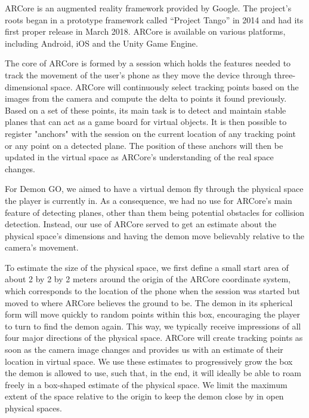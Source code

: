 ARCore is an augmented reality framework provided by Google.
The project's roots began in a prototype framework called \enquote{Project Tango} in 2014 and had its first proper release in March 2018. \cite{ArsARCore}
ARCore is available on various platforms, including Android, iOS and the Unity Game Engine. \cite{ARCore}

The core of ARCore is formed by a session which holds the features needed to track the movement of the user's phone as they move the device through three-dimensional space.
ARCore will continuously select tracking points based on the images from the camera and compute the delta to points it found previously.
Based on a set of these points, its main task is to detect and maintain stable planes that can act as a game board for virtual objects.
It is then possible to register "anchors" with the session on the current location of any tracking point or any point on a detected plane.
The position of these anchors will then be updated in the virtual space as ARCore's understanding of the real space changes. \cite{ARCoreConcepts}

For Demon GO, we aimed to have a virtual demon fly through the physical space the player is currently in.
As a consequence, we had no use for ARCore's main feature of detecting planes, other than them being potential obstacles for collision detection.
Instead, our use of ARCore served to get an estimate about the physical space's dimensions and having the demon move believably relative to the camera's movement.

To estimate the size of the physical space, we first define a small start area of about 2 by 2 by 2 meters around the origin of the ARCore coordinate system, which corresponds to the location of the phone when the session was started but moved to where ARCore believes the ground to be.
The demon in its spherical form will move quickly to random points within this box, encouraging the player to turn to find the demon again.
This way, we typically receive impressions of all four major directions of the physical space.
ARCore will create tracking points as soon as the camera image changes and provides us with an estimate of their location in virtual space.
We use these estimates to progressively grow the box the demon is allowed to use, such that, in the end, it will ideally be able to roam freely in a box-shaped estimate of the physical space.
We limit the maximum extent of the space relative to the origin to keep the demon close by in open physical spaces.

